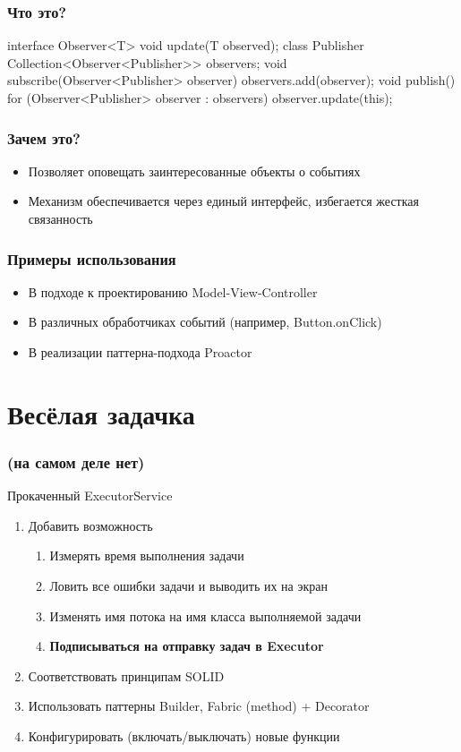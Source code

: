 \documentclass[russian,aspectratio=169,14pt]{beamer}
\begin{document}
\begin{frame}[fragile]
	\frametitle{Что это?}
	\begin{listjava}
interface Observer<T> {
    void update(T observed);
}
class Publisher {
    Collection<Observer<Publisher>> observers;
    void subscribe(Observer<Publisher> observer) {
        observers.add(observer);
    }
    void publish() {
        for (Observer<Publisher> observer : observers) {
            observer.update(this);
        }
    }
}
	\end{listjava}
\end{frame}

\begin{frame}
	\frametitle{Зачем это?}
	\begin{itemize}
		\item Позволяет оповещать заинтересованные объекты о событиях
		\pause
		\item Механизм обеспечивается через единый интерфейс, избегается жесткая связанность
	\end{itemize}
\end{frame}

\begin{frame}
	\frametitle{Примеры использования}
	\begin{itemize}
		\item В подходе к проектированию Model-View-Controller
		\item В различных обработчиках событий (например, Button.onClick)
		\item В реализации паттерна-подхода Proactor
	\end{itemize}
\end{frame}




\section*{Весёлая задачка}

\begin{frame}
    \frametitle{(на самом деле нет)}
    Прокаченный ExecutorService
    \vfill
    \begin{enumerate}
    	\item Добавить возможность
    	\begin{enumerate}
    		\item Измерять время выполнения задачи
    		\item Ловить все ошибки задачи и выводить их на экран
    		\item Изменять имя потока на имя класса выполняемой задачи
    		\item \textbf{Подписываться на отправку задач в Executor}
    	\end{enumerate}
    	\item Соответствовать принципам SOLID
    	\item Использовать паттерны Builder, Fabric (method) + Decorator
    	\item Конфигурировать (включать/выключать) новые функции
    \end{enumerate}
\end{frame}
\end{document}
